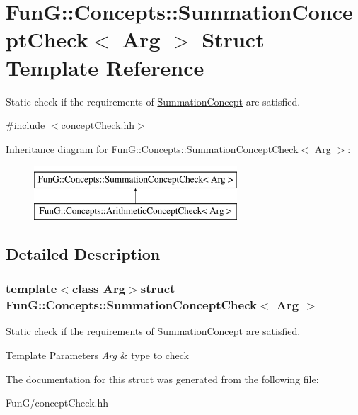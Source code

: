 \hypertarget{structFunG_1_1Concepts_1_1SummationConceptCheck}{\section{Fun\-G\-:\-:Concepts\-:\-:Summation\-Concept\-Check$<$ Arg $>$ Struct Template Reference}
\label{structFunG_1_1Concepts_1_1SummationConceptCheck}
}


Static check if the requirements of \hyperlink{structFunG_1_1Concepts_1_1SummationConcept}{Summation\-Concept} are satisfied.  




{\ttfamily \#include $<$concept\-Check.\-hh$>$}

Inheritance diagram for Fun\-G\-:\-:Concepts\-:\-:Summation\-Concept\-Check$<$ Arg $>$\-:\begin{figure}[H]
\begin{center}
\leavevmode
\includegraphics[height=2.000000cm]{structFunG_1_1Concepts_1_1SummationConceptCheck}
\end{center}
\end{figure}


\subsection{Detailed Description}
\subsubsection*{template$<$class Arg$>$struct Fun\-G\-::\-Concepts\-::\-Summation\-Concept\-Check$<$ Arg $>$}

Static check if the requirements of \hyperlink{structFunG_1_1Concepts_1_1SummationConcept}{Summation\-Concept} are satisfied. 


\begin{DoxyTemplParams}{Template Parameters}
{\em Arg} & type to check \\
\hline
\end{DoxyTemplParams}


The documentation for this struct was generated from the following file\-:\begin{DoxyCompactItemize}
\item 
Fun\-G/concept\-Check.\-hh\end{DoxyCompactItemize}
